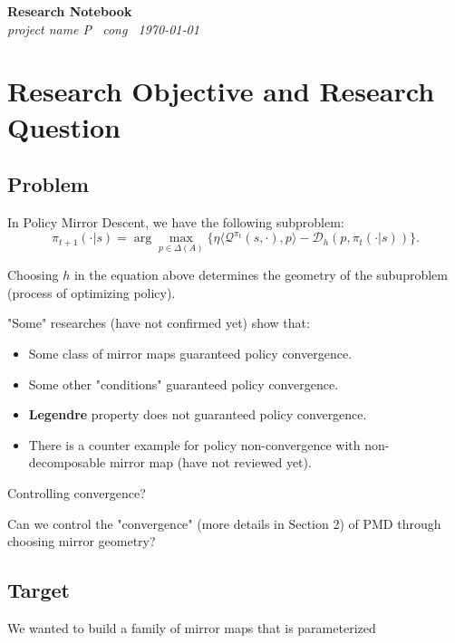 \documentclass[11pt,a4paper]{article}
\begin{document}
\begin{center}
  {\Large\bfseries Research Notebook}\\[2pt]
  {\small\itshape project name P \textperiodcentered\ cong \textperiodcentered\ \today}
\end{center}
\vspace{0.5em}

\tableofcontents
\newpage


\section{Research Objective and Research Question}

\subsection{Problem}

In Policy Mirror Descent, we have the following subproblem:
\[
\pi_{t+1}(\cdot|s) = \arg\max_{p\in \Delta(A)}\{\eta\langle\mathcal{Q}^{\pi_t}(s, \cdot),p\rangle - \mathcal{D}_h(p, \pi_t(\cdot|s))\}.
\]

Choosing $h$ in the equation above determines the geometry of the subuproblem (process of optimizing policy).

"Some" researches (have not confirmed yet) show that:
\begin{itemize}
    \item Some class of mirror maps guaranteed policy convergence.
    \item Some other "conditions" guaranteed policy convergence.
    \item \textbf{Legendre} property does not guaranteed policy convergence.
    \item There is a counter example for policy non-convergence with non-decomposable mirror map (have not reviewed yet).
\end{itemize}

\begin{question}{Controlling convergence?}

Can we control the "convergence" (more details in Section 2) of PMD through choosing mirror geometry? 
\end{question}

\subsection{Target}
We wanted to build a family of mirror maps that is parameterized
\end{document}

